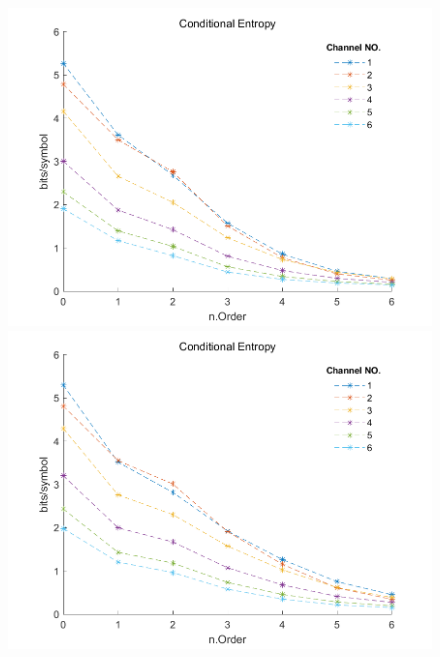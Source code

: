 \documentclass[notes=hide]{beamer}
\begin{document}
\begin{frame}
\begin{figure}
   	\includegraphics[scale=0.26]{Vortrag/50f6oc1to6.png}
   	\includegraphics[scale=0.26]{Vortrag/100f6oc1to6.png}
   \end{figure}
\end{frame}


\newpage
\end{document}
